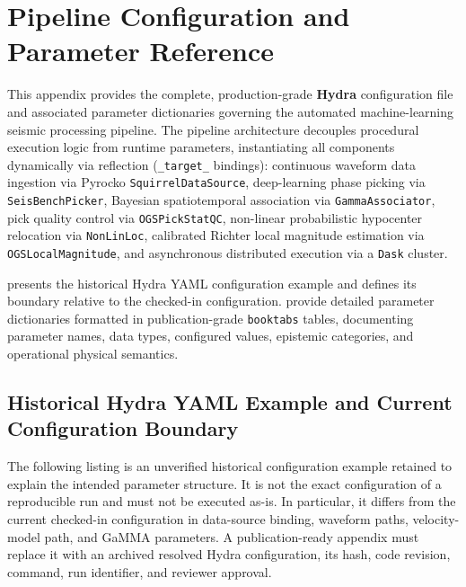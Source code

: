 
\chapter{Pipeline Configuration and Parameter Reference}
\label{units:app:config}

This appendix provides the complete, production-grade \textbf{Hydra}
\parencite{Hydra} configuration file and associated parameter
dictionaries governing the automated machine-learning seismic
processing pipeline. The pipeline architecture decouples procedural
execution logic from runtime parameters, instantiating all
components dynamically via reflection (\texttt{\_target\_}
bindings): continuous waveform data ingestion via Pyrocko
\texttt{SquirrelDataSource}, deep-learning phase picking via
\texttt{SeisBenchPicker}, Bayesian spatiotemporal association via
\texttt{GammaAssociator}, pick quality control via
\texttt{OGSPickStatQC}, non-linear probabilistic hypocenter
relocation via \texttt{NonLinLoc}, calibrated Richter local
magnitude estimation via \texttt{OGSLocalMagnitude}, and
asynchronous distributed execution via a \texttt{Dask} cluster.

 presents the historical Hydra YAML
configuration example and defines its boundary relative to the
checked-in configuration.
provide detailed parameter
dictionaries formatted in publication-grade \texttt{booktabs}
tables, documenting parameter names, data types, configured values,
epistemic categories, and operational physical semantics.

\section{Historical Hydra YAML Example and Current Configuration Boundary}
\label{sec:app_yaml}

The following listing is an unverified historical configuration
example retained to explain the intended parameter structure. It is
not the exact configuration of a reproducible run and must not be
executed as-is. In particular, it differs from the current
checked-in configuration in data-source binding, waveform paths,
velocity-model path, and \ac{GaMMA} parameters. A publication-ready
appendix must replace it with an archived resolved Hydra
configuration, its hash, code revision, command, run identifier, and
reviewer approval.

